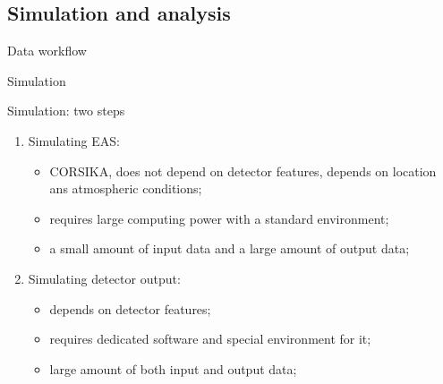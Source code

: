 \subsection{Simulation and analysis}

\begin{frame}{Data workflow}
\vspace{-2em}
\centering
{}
\end{frame}

\begin{frame}{Simulation}
\begin{block}{Simulation: two steps}
\begin{enumerate}
\item Simulating EAS:
  \begin{itemize}
  \item CORSIKA, does not depend on detector features, depends on location ans atmospheric conditions;
  \item requires large computing power with a standard environment;
  \item a small amount of input data and a large amount of output data;
  \end{itemize}
\item Simulating detector output:
  \begin{itemize}
  \item depends on detector features;
  \item requires dedicated software and special environment for it;
  \item large amount of both input and output data;
  \end{itemize}
\end{enumerate}
\end{block}
\end{frame}

